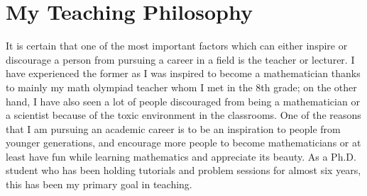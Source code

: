 \documentclass{article}
\begin{document}
\newcommand{\frakA}{{\mathfrak A}}
\newcommand{\frakB}{{\mathfrak B}}
\newcommand{\frakC}{{\mathfrak C}}
\newcommand{\frakD}{{\mathfrak D}}
\newcommand{\frakE}{{\mathfrak E}}
\newcommand{\frakF}{{\mathfrak F}}
\newcommand{\frakG}{{\mathfrak G}}
\newcommand{\frakH}{{\mathfrak H}}
\newcommand{\frakI}{{\mathfrak I}}
\newcommand{\frakJ}{{\mathfrak J}}
\newcommand{\frakK}{{\mathfrak K}}
\newcommand{\frakL}{{\mathfrak L}}
\newcommand{\frakM}{{\mathfrak M}}
\newcommand{\frakN}{{\mathfrak N}}
\newcommand{\frakO}{{\mathfrak O}}
\newcommand{\frakP}{{\mathfrak P}}
\newcommand{\frakQ}{{\mathfrak Q}}
\newcommand{\frakR}{{\mathfrak R}}
\newcommand{\frakS}{{\mathfrak S}}
\newcommand{\frakT}{{\mathfrak T}}
\newcommand{\frakU}{{\mathfrak U}}
\newcommand{\frakV}{{\mathfrak V}}
\newcommand{\frakW}{{\mathfrak W}}
\newcommand{\frakX}{{\mathfrak X}}
\newcommand{\frakY}{{\mathfrak Y}}
\newcommand{\frakZ}{{\mathfrak Z}}





\newcommand{\Zbar}{{\overline{\bbZ}}}
\newcommand{\kbar}{{\overline{k}}}
\newcommand{\Kbar}{{\overline{K}}}
\newcommand{\Fbar}{{\overline{\bbF}}}
\newcommand{\Vbar}{{\overline{V}}}
\newcommand{\Ybar}{{\overline{Y}}}
\newcommand{\Ubar}{{\overline{U}}}
\newcommand{\Cbar}{{\overline{C}}}
\newcommand{\Lbar}{{\overline{L}}}
\newcommand{\pbar}{{\overline{p}}}
\newcommand{\barQ}{{\overline{\bbQ}}}


\newcommand{\AK}{{\bbA^{\times}_K}}
\newcommand{\AF}{{\bbA^{\times}_F}}
\newcommand{\AM}{{\bbA^{\times}_M}}





\newcommand{\Zhat}{{\hat{\bbZ}}}


\newcommand{\OK}{{\mathcal{O}_K}}
\newcommand{\Ov}{{\mathcal{O}_v}}
\newcommand{\Tf}{{\mathbb{T}_f}}
\newcommand{\Tfac}{{\mathbb{T}_f^{ac}}}
\newcommand{\Tfxac}{{\mathbb{T}_{f,\chi}^{ac}}}
\newcommand{\Tfx}{{\mathbb{T}_{f,\chi}}}
\newcommand{\frakfx}{{\mathfrak f}_{\chi}}

\section*{My Teaching Philosophy}

\par It is certain that one of the most important factors which can either inspire or discourage a person from pursuing a career in a field is the teacher or lecturer. I have experienced the former as I was inspired to become a mathematician thanks to mainly my math olympiad teacher whom I met in the 8th grade; on the other hand, I have also seen a lot of people discouraged from being a mathematician or a scientist because of the toxic environment in the classrooms. One of the reasons that I am pursuing an academic career is to be an inspiration to people from younger generations, and encourage more people to become mathematicians or at least have fun while learning mathematics and appreciate its beauty. As a Ph.D. student who has been holding tutorials and problem sessions for almost six years, this has been my primary goal in teaching.
\end{document}
